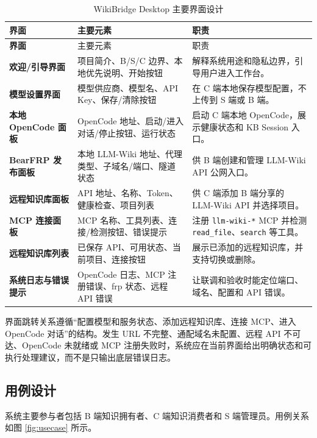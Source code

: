 \documentclass[UTF8,a4paper,12pt,fontset=fandol]{ctexart}
\newcommand{\code}[1]{\texttt{\footnotesize #1}}
\begin{document}
\begin{longtable}{>{\bfseries}p{3.2cm}p{5.1cm}p{5.7cm}}
\caption{WikiBridge Desktop 主要界面设计}\label{tab:ui}\\
\toprule
界面 & 主要元素 & 职责 \\
\midrule
\endfirsthead
\toprule
界面 & 主要元素 & 职责 \\
\midrule
\endhead
欢迎/引导界面 & 项目简介、B/S/C 边界、本地优先说明、开始按钮 & 解释系统用途和隐私边界，引导用户进入工作台。 \\
模型设置界面 & 模型供应商、模型名、API Key、保存/清除按钮 & 在 C 端本地保存模型配置，不上传到 S 端或 B 端。 \\
本地 OpenCode 面板 & OpenCode 地址、启动/进入对话/停止按钮、运行状态 & 启动 C 端本地 OpenCode，展示健康状态和 KB Session 入口。 \\
BearFRP 发布面板 & 本地 LLM-Wiki 地址、代理类型、子域名/端口、隧道状态 & 供 B 端创建和管理 LLM-Wiki API 公网入口。 \\
远程知识库面板 & API 地址、名称、Token、健康检查、项目列表 & 供 C 端添加 B 端分享的 LLM-Wiki API 并选择项目。 \\
MCP 连接面板 & MCP 名称、工具列表、连接/检测按钮、错误提示 & 注册 \code{llm-wiki-*} MCP 并检测 \code{read\_file}、\code{search} 等工具。 \\
远程知识库列表 & 已保存 API、可用状态、当前项目、连接按钮 & 展示已添加的远程知识库，并支持切换或删除。 \\
系统日志与错误提示 & OpenCode 日志、MCP 注册错误、frp 状态、远程 API 错误 & 让联调和验收时能定位端口、域名、配置和 API 错误。 \\
\bottomrule
\end{longtable}

界面跳转关系遵循“配置模型和服务状态、添加远程知识库、连接 MCP、进入 OpenCode 对话”的结构。发生 URL 不完整、通配域名未配置、远程 API 不可达、OpenCode 未就绪或 MCP 注册失败时，系统应在当前界面给出明确状态和可执行处理建议，而不是只输出底层错误日志。

\subsection{用例设计}
系统主要参与者包括 B 端知识拥有者、C 端知识消费者和 S 端管理员。用例关系如图 \ref{fig:usecase} 所示。
\end{document}
